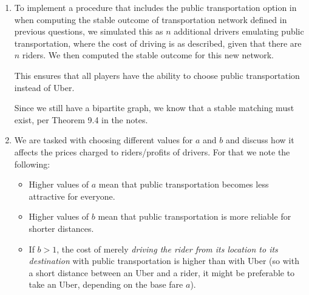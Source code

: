 \documentclass{article}
\begin{document}
\begin{enumerate}[label=(\alph*)]

    \item 
    To implement a procedure that includes the public transportation option in when computing the stable outcome of transportation network defined in previous questions, we simulated this as $n$ additional drivers emulating public transportation, where the cost of driving is as described, given that there are $n$ riders. We then computed the stable outcome for this new network.

    This ensures that all players have the ability to choose public transportation instead of Uber.

    Since we still have a bipartite graph, we know that a stable matching must exist, per Theorem 9.4 in the notes.
    
    \item 
    We are tasked with choosing different values for $a$ and $b$ and discuss how it affects the prices charged to riders/profits of drivers. For that we note the following:

    \begin{itemize}
        \item Higher values of $a$ mean that public transportation becomes less attractive for everyone.
        \item Higher values of $b$ mean that public transportation is more reliable for shorter distances.
        \item If $b>1$, the cost of merely \textit{driving the rider from its location to its destination} with public transportation is higher than with Uber (so with a short distance between an Uber and a rider, it might be preferable to take an Uber, depending on the base fare $a$).
    \end{itemize}

\end{enumerate}


\end{document}
